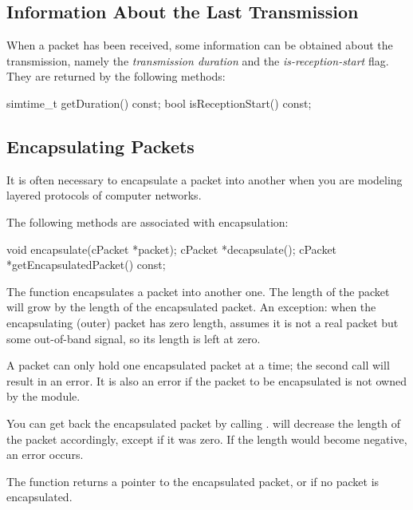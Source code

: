 \subsection{Information About the Last Transmission}
\label{sec:messages:information-about-last-transmission}

When a packet has been received, some information can be obtained
about the transmission, namely the \textit{transmission duration}
and the \textit{is-reception-start} flag. They are returned by
the following methods:

\begin{cpp}
simtime_t getDuration() const;
bool isReceptionStart() const;
\end{cpp}


\subsection{Encapsulating Packets}
\label{sec:messages:encapsulating-packets}

It is often necessary to encapsulate a packet
into another when you are modeling layered protocols of computer networks.

The following  methods are associated with encapsulation:

\begin{cpp}
void encapsulate(cPacket *packet);
cPacket *decapsulate();
cPacket *getEncapsulatedPacket() const;
\end{cpp}

The  function encapsulates a packet into another one.
The length of the packet will grow by the length of the encapsulated
packet. An exception: when the encapsulating (outer) packet has zero
length, {\opp} assumes it is not a real packet but some out-of-band signal,
so its length is left at zero.

A packet can only hold one encapsulated packet at a time; the second
 call will result in an error. It is also an error if
the packet to be encapsulated is not owned by the module.

You can get back the encapsulated packet by calling .
 will decrease the length of the packet accordingly,
except if it was zero. If the length would become negative, an error
occurs.

The  function returns a pointer to the
encapsulated packet, or  if no packet is encapsulated.

